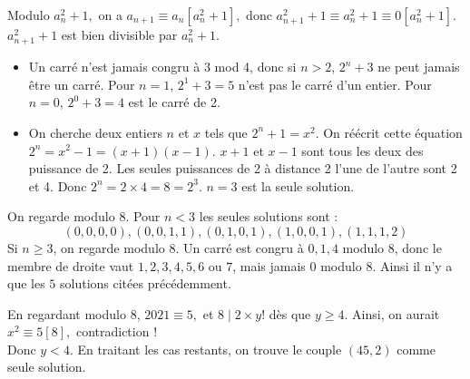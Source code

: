 \begin{sol}
Modulo $a_n^2+1,$ on a $a_{n+1}\equiv a_n[a_n^2+1],$ donc $a_{n+1}^2+1\equiv a_n^2+1\equiv 0[a_n^2+1]$. $a_{n+1}^2+1$ est bien divisible par $a_n^2+1$.
\end{sol}


\begin{sol}
\begin{itemize}
    \item Un carré n’est jamais congru à 3 mod 4, donc si $n > 2$, $2^n + 3$ ne peut jamais être un carré. Pour $n = 1$, $2^1 + 3 = 5$ n’est pas le carré d’un entier. Pour $n = 0$, $2^0 + 3 = 4$ est le carré de 2.
    \item On cherche deux entiers $n$ et $x$ tels que $2^n + 1 = x^2$. On réécrit cette équation $2^n =x^2-1 = (x + 1)(x - 1)$. $x + 1$ et $x - 1$ sont tous les deux des puissance de 2. Les seules puissances de 2 à distance 2 l’une de l’autre sont 2 et 4. Donc $2^n = 2 \times 4 = 8 = 2^3$. $n = 3$ est la seule solution.
\end{itemize}
\end{sol}


\begin{sol} 
On regarde modulo $8$. Pour $n<3$ les seules solutions sont :
$$(0,0,0,0),(0,0,1,1),(0,1,0,1),(1,0,0,1),(1,1,1,2)$$
Si $n\geq 3$, on regarde modulo $8$. Un carré est congru à $0,1,4$ modulo $8$, donc le membre de droite vaut $1,2,3,4,5,6$ ou $7$, mais jamais $0$ modulo $8$. Ainsi il n'y a que les $5$ solutions citées précédemment.
\end{sol}


\begin{sol}
En regardant modulo $8$, $2021\equiv 5,$ et $8\mid 2\times y!$ dès que $y\ge 4.$ Ainsi, on aurait $x^2\equiv 5[8],$ contradiction !\\
Donc $y<4$. En traitant les cas restants, on trouve le couple $(45,2)$ comme seule solution.
\end{sol}





